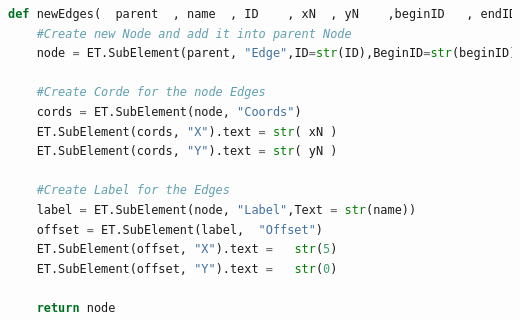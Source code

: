 \begin{lstlisting}[language=Python, caption=Python Function new Edges]
def newEdges(  parent  , name  , ID    , xN  , yN    ,beginID   , endID    ):
	#Create new Node and add it into parent Node	
	node = ET.SubElement(parent, "Edge",ID=str(ID),BeginID=str(beginID),EndID=str(endID),Rate=str(name),Title=str(name) , ArrowOnCenter="true" , ArrowPosition="50")  
	
	#Create Corde for the node Edges
	cords = ET.SubElement(node, "Coords")
	ET.SubElement(cords, "X").text = str( xN )
	ET.SubElement(cords, "Y").text = str( yN )
		 		 		  
	#Create Label for the Edges
	label = ET.SubElement(node, "Label",Text = str(name))
	offset = ET.SubElement(label,  "Offset")
	ET.SubElement(offset, "X").text =   str(5)
	ET.SubElement(offset, "Y").text =   str(0)
 
	return node 
\end{lstlisting}

